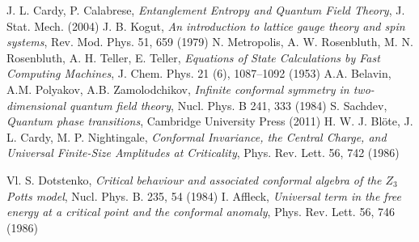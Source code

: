 \documentclass[aps,pra,superscriptaddress]{revtex4}
\renewcommand{\(}{\left(}
\renewcommand{\)}{\right)}
\renewcommand{\[}{\left[}
\renewcommand{\]}{\right]}
\begin{document}
\newpage

\begin{thebibliography}{1}
 J. L. Cardy, P. Calabrese, \emph{Entanglement Entropy and Quantum Field Theory}, J. Stat. Mech. (2004)
 J. B. Kogut, \emph{An introduction to lattice gauge theory and spin systems}, Rev. Mod. Phys. 51, 659 (1979)
 N. Metropolis, A. W. Rosenbluth, M. N. Rosenbluth, A. H. Teller, E. Teller, \emph{Equations of State Calculations by Fast Computing Machines}, J. Chem. Phys. 21 (6), 1087–1092 (1953)
 A.A. Belavin, A.M. Polyakov, A.B. Zamolodchikov, \emph{Infinite conformal symmetry in two-dimensional quantum field theory}, Nucl. Phys. B 241, 333 (1984)
 S. Sachdev, \emph{Quantum phase transitions}, Cambridge University Press (2011)
  H. W. J. Bl\"ote, J. L. Cardy, M. P. Nightingale, \emph{Conformal Invariance, the Central Charge, and Universal Finite-Size Amplitudes at Criticality}, Phys. Rev. Lett. 56, 742 (1986)

 Vl. S. Dotstenko, \emph{Critical behaviour and associated conformal algebra of the $Z_3$ Potts model}, Nucl. Phys. B. 235, 54 (1984)
 I. Affleck, \emph{Universal term in the free energy at a critical point and the conformal anomaly}, Phys. Rev. Lett. 56, 746 (1986)
\end{thebibliography}
\end{document}
